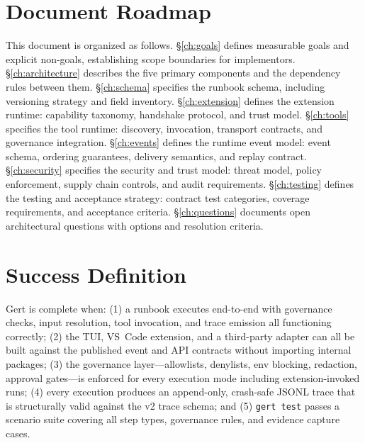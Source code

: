 \section{Document Roadmap}

This document is organized as follows. \S\ref{ch:goals} defines measurable goals and explicit
non-goals, establishing scope boundaries for implementors. \S\ref{ch:architecture} describes the five
primary components and the dependency rules between them. \S\ref{ch:schema} specifies the runbook
schema, including versioning strategy and field inventory. \S\ref{ch:extension}
defines the extension runtime: capability taxonomy, handshake protocol, and trust model.
\S\ref{ch:tools} specifies the tool runtime: discovery, invocation, transport contracts, and governance
integration. \S\ref{ch:events} defines the runtime event model: event schema, ordering guarantees,
delivery semantics, and replay contract. \S\ref{ch:security} specifies the security and trust model:
threat model, policy enforcement, supply chain controls, and audit requirements. \S\ref{ch:testing}
defines the testing and acceptance strategy: contract test categories, coverage requirements, and
acceptance criteria. \S\ref{ch:questions} documents open architectural questions with options and
resolution criteria.

\section{Success Definition}

Gert is complete when: (1) a runbook executes end-to-end with governance checks, input resolution,
tool invocation, and trace emission all functioning correctly; (2) the TUI, VS~Code extension, and a third-party adapter can all be
built against the published event and API contracts without importing internal packages; (3) the
governance layer---allowlists, denylists, env blocking, redaction, approval gates---is enforced for
every execution mode including extension-invoked runs; (4) every execution produces an append-only,
crash-safe JSONL trace that is structurally valid against the v2 trace schema; and (5) \texttt{gert
test} passes a scenario suite covering all step types, governance rules, and evidence capture cases.
